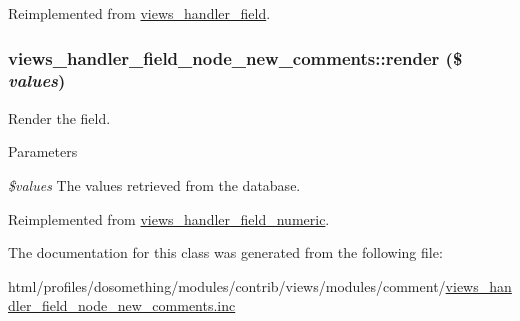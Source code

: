 Reimplemented from \hyperlink{classviews__handler__field_a4f661f91bcbe80d4a00c30a31456c502}{views\_\-handler\_\-field}.\hypertarget{classviews__handler__field__node__new__comments_a6b1e79531ba28eb32e71c7ff2129e82d}{
\subsubsection[{render}]{\setlength{\rightskip}{0pt plus 5cm}views\_\-handler\_\-field\_\-node\_\-new\_\-comments::render (\$ {\em values})}}
\label{classviews__handler__field__node__new__comments_a6b1e79531ba28eb32e71c7ff2129e82d}
Render the field.


\begin{DoxyParams}{Parameters}
\item[{\em \$values}]The values retrieved from the database. \end{DoxyParams}


Reimplemented from \hyperlink{classviews__handler__field__numeric_a9c76aeef951c45385fd91a22e5e656aa}{views\_\-handler\_\-field\_\-numeric}.

The documentation for this class was generated from the following file:\begin{DoxyCompactItemize}
\item 
html/profiles/dosomething/modules/contrib/views/modules/comment/\hyperlink{views__handler__field__node__new__comments_8inc}{views\_\-handler\_\-field\_\-node\_\-new\_\-comments.inc}\end{DoxyCompactItemize}
